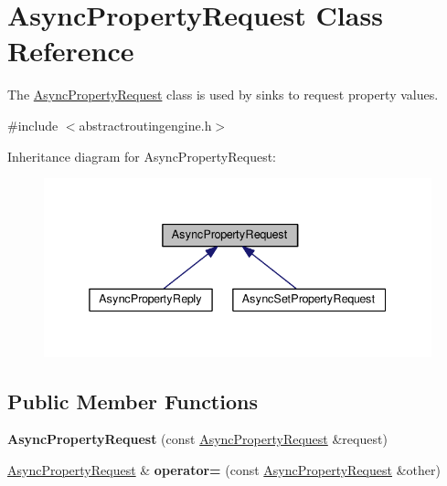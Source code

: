 \hypertarget{classAsyncPropertyRequest}{\section{Async\+Property\+Request Class Reference}
\label{classAsyncPropertyRequest}
}


The \hyperlink{classAsyncPropertyRequest}{Async\+Property\+Request} class is used by sinks to request property values.  




{\ttfamily \#include $<$abstractroutingengine.\+h$>$}



Inheritance diagram for Async\+Property\+Request\+:\nopagebreak
\begin{figure}[H]
\begin{center}
\leavevmode
\includegraphics[width=338pt]{classAsyncPropertyRequest__inherit__graph}
\end{center}
\end{figure}
\subsection*{Public Member Functions}
\begin{DoxyCompactItemize}
\item 
\hypertarget{classAsyncPropertyRequest_ad46cfdd3411c11beaa00b70d1c6419d9}{{\bfseries Async\+Property\+Request} (const \hyperlink{classAsyncPropertyRequest}{Async\+Property\+Request} \&request)}\label{classAsyncPropertyRequest_ad46cfdd3411c11beaa00b70d1c6419d9}

\item 
\hypertarget{classAsyncPropertyRequest_ad1de0c87f190106cf70a996e5cba1088}{\hyperlink{classAsyncPropertyRequest}{Async\+Property\+Request} \& {\bfseries operator=} (const \hyperlink{classAsyncPropertyRequest}{Async\+Property\+Request} \&other)}\label{classAsyncPropertyRequest_ad1de0c87f190106cf70a996e5cba1088}

\end{DoxyCompactItemize}
